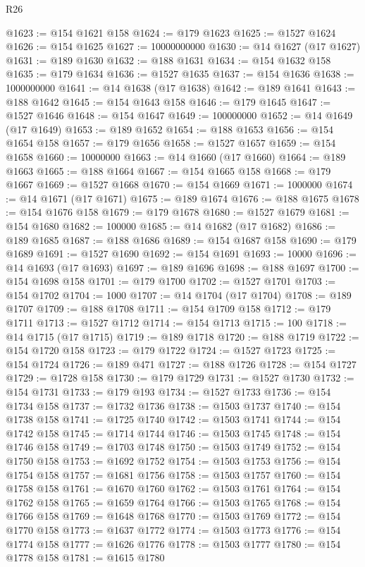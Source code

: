 \begin{lexlean}{R26}
\begin{coremodule}
@1623 := @154 @1621 @158
@1624 := @179 @1623
@1625 := @1527 @1624
@1626 := @154 @1625
@1627 := 10000000000
@1630 := @14 @1627 (@17 @1627)
@1631 := @189 @1630
@1632 := @188 @1631
@1634 := @154 @1632 @158
@1635 := @179 @1634
@1636 := @1527 @1635
@1637 := @154 @1636
@1638 := 1000000000
@1641 := @14 @1638 (@17 @1638)
@1642 := @189 @1641
@1643 := @188 @1642
@1645 := @154 @1643 @158
@1646 := @179 @1645
@1647 := @1527 @1646
@1648 := @154 @1647
@1649 := 100000000
@1652 := @14 @1649 (@17 @1649)
@1653 := @189 @1652
@1654 := @188 @1653
@1656 := @154 @1654 @158
@1657 := @179 @1656
@1658 := @1527 @1657
@1659 := @154 @1658
@1660 := 10000000
@1663 := @14 @1660 (@17 @1660)
@1664 := @189 @1663
@1665 := @188 @1664
@1667 := @154 @1665 @158
@1668 := @179 @1667
@1669 := @1527 @1668
@1670 := @154 @1669
@1671 := 1000000
@1674 := @14 @1671 (@17 @1671)
@1675 := @189 @1674
@1676 := @188 @1675
@1678 := @154 @1676 @158
@1679 := @179 @1678
@1680 := @1527 @1679
@1681 := @154 @1680
@1682 := 100000
@1685 := @14 @1682 (@17 @1682)
@1686 := @189 @1685
@1687 := @188 @1686
@1689 := @154 @1687 @158
@1690 := @179 @1689
@1691 := @1527 @1690
@1692 := @154 @1691
@1693 := 10000
@1696 := @14 @1693 (@17 @1693)
@1697 := @189 @1696
@1698 := @188 @1697
@1700 := @154 @1698 @158
@1701 := @179 @1700
@1702 := @1527 @1701
@1703 := @154 @1702
@1704 := 1000
@1707 := @14 @1704 (@17 @1704)
@1708 := @189 @1707
@1709 := @188 @1708
@1711 := @154 @1709 @158
@1712 := @179 @1711
@1713 := @1527 @1712
@1714 := @154 @1713
@1715 := 100
@1718 := @14 @1715 (@17 @1715)
@1719 := @189 @1718
@1720 := @188 @1719
@1722 := @154 @1720 @158
@1723 := @179 @1722
@1724 := @1527 @1723
@1725 := @154 @1724
@1726 := @189 @471
@1727 := @188 @1726
@1728 := @154 @1727
@1729 := @1728 @158
@1730 := @179 @1729
@1731 := @1527 @1730
@1732 := @154 @1731
@1733 := @179 @193
@1734 := @1527 @1733
@1736 := @154 @1734 @158
@1737 := @1732 @1736
@1738 := @1503 @1737
@1740 := @154 @1738 @158
@1741 := @1725 @1740
@1742 := @1503 @1741
@1744 := @154 @1742 @158
@1745 := @1714 @1744
@1746 := @1503 @1745
@1748 := @154 @1746 @158
@1749 := @1703 @1748
@1750 := @1503 @1749
@1752 := @154 @1750 @158
@1753 := @1692 @1752
@1754 := @1503 @1753
@1756 := @154 @1754 @158
@1757 := @1681 @1756
@1758 := @1503 @1757
@1760 := @154 @1758 @158
@1761 := @1670 @1760
@1762 := @1503 @1761
@1764 := @154 @1762 @158
@1765 := @1659 @1764
@1766 := @1503 @1765
@1768 := @154 @1766 @158
@1769 := @1648 @1768
@1770 := @1503 @1769
@1772 := @154 @1770 @158
@1773 := @1637 @1772
@1774 := @1503 @1773
@1776 := @154 @1774 @158
@1777 := @1626 @1776
@1778 := @1503 @1777
@1780 := @154 @1778 @158
@1781 := @1615 @1780

\end{coremodule}
\end{lexlean}
